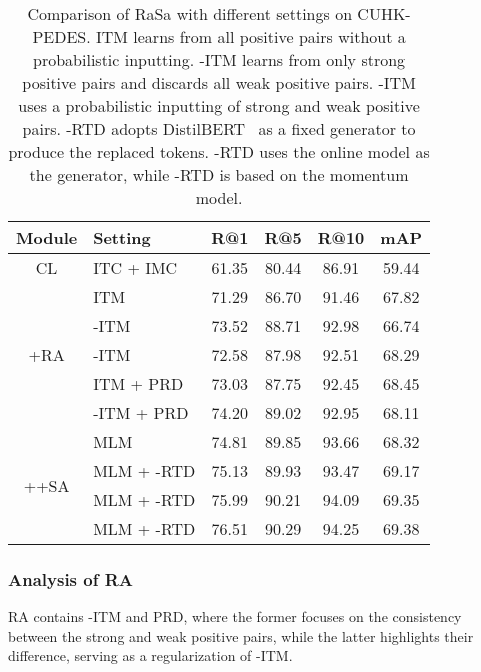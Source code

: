 \documentclass{article}
\begin{document}
\begin{table}[tp]
\small
\renewcommand\arraystretch{1.2}
\setlength{\tabcolsep}{5pt}
\centering
\begin{tabular}{c|l|cccc} 
\hline
Module              & Setting         & R@1            & R@5            & R@10           & mAP             \\ 
\hline
CL                  & ITC + IMC         & 61.35          & 80.44          & 86.91          & 59.44           \\ 
\hline
\multirow{5}{*}{+RA} & ITM            & 71.29          & 86.70          & 91.46          & 67.82           \\
                    & -ITM          & 73.52          & 88.71          & 92.98          & 66.74           \\
                    & -ITM          & 72.58          & 87.98          & 92.51          & 68.29           \\
                    & ITM + PRD        & 73.03          & 87.75          & 92.45          & 68.45           \\
                    & -ITM + PRD      & 74.20          & 89.02          & 92.95          & 68.11           \\ 
\hline
\multirow{4}{*}{++SA} & MLM         & 74.81          & 89.85          & 93.66          & 68.32           \\
                    & MLM + -RTD & 75.13          & 89.93          & 93.47          & 69.17           \\
                    & MLM + -RTD & 75.99          & 90.21          & 94.09          & 69.35           \\
                    & MLM + -RTD & 76.51          & 90.29          & 94.25          & 69.38  \\
\hline
\end{tabular}
\caption{Comparison of RaSa with different settings on CUHK-PEDES. ITM learns from all positive pairs without a probabilistic inputting. -ITM learns from only strong positive pairs and discards all weak positive pairs. -ITM uses a probabilistic inputting of strong and weak positive pairs. -RTD adopts DistilBERT~\protect\cite{sanh2019distilbert} as a fixed generator to produce the replaced tokens. -RTD uses the online model as the generator, while -RTD is based on the momentum model.}
\label{table4}
\end{table}



\subsubsection{Analysis of RA}
RA contains -ITM and PRD, where the former focuses on the consistency between the strong and weak positive pairs, while the latter highlights their difference, serving as a regularization of -ITM. 
\end{document}
